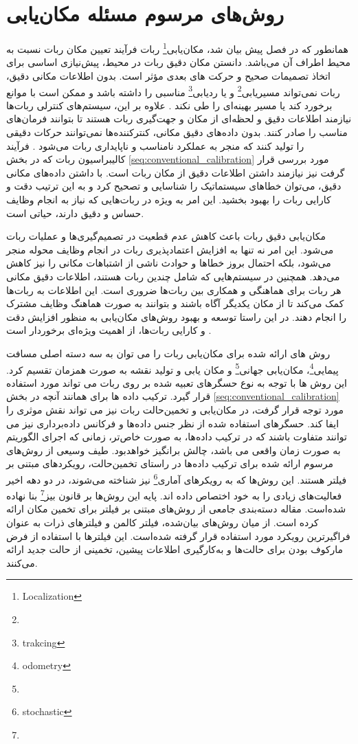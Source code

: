 \section{روش‌های مرسوم مسئله مکان‌یابی}
همانطور که در فصل پیش بیان شد، مکان‌یابی\footnote{Localization}
 ربات فرآیند تعیین مکان ربات نسبت به محیط اطراف آن می‌باشد. دانستن مکان دقیق ربات در محیط، پیش‌نیازی اساسی برای اتخاذ تصمیمات صحیح و حرکت های بعدی مؤثر است. بدون اطلاعات مکانی دقیق، ربات نمی‌تواند مسیریابی\footnote{}
  و یا ردیابی\footnote{trakcing}
مناسبی را داشته باشد و ممکن است با موانع برخورد کند یا مسیر بهینه‌ای را طی نکند
\cite{ahmad2013cooperative}.
 علاوه بر این، سیستم‌های کنترلی ربات‌ها نیازمند اطلاعات دقیق و لحظه‌ای از مکان و جهت‌گیری ربات هستند تا بتوانند فرمان‌های مناسب را صادر کنند. بدون داده‌های دقیق مکانی، کنترکننده‌ها نمی‌توانند حرکات دقیقی را تولید کنند که منجر به عملکرد نامناسب و ناپایداری ربات می‌شود
\cite{guibas1997robot}.
فرآیند کالیبراسیون ربات که در بخش 
\ref{seq:conventional_calibration}
مورد بررسی قرار گرفت نیز نیازمند داشتن اطلاعات دقیق از مکان ربات است. با داشتن داده‌های مکانی دقیق، می‌توان خطاهای سیستماتیک را شناسایی و تصحیح کرد و به این ترتیب دقت و کارایی ربات را بهبود بخشید. این امر به ویژه در ربات‌هایی که نیاز به انجام وظایف حساس و دقیق دارند، حیاتی است. 

مکان‌یابی دقیق ربات باعث کاهش عدم قطعیت در تصمیم‌گیری‌ها و عملیات ربات می‌شود. این امر نه تنها به افزایش اعتمادپذیری ربات در انجام وظایف محوله منجر می‌شود، بلکه احتمال بروز خطاها و حوادث ناشی از اشتباهات مکانی را نیز کاهش می‌دهد. همچنین در سیستم‌هایی که شامل چندین ربات هستند، اطلاعات دقیق مکانی هر ربات برای هماهنگی و همکاری بین ربات‌ها ضروری است. این اطلاعات به ربات‌ها کمک می‌کند تا از مکان یکدیگر آگاه باشند و بتوانند به صورت هماهنگ وظایف مشترک را انجام دهند. در این راستا توسعه و بهبود روش‌های مکان‌یابی به منظور افزایش دقت و کارایی ربات‌ها، از اهمیت ویژه‌ای برخوردار است
\cite{aragues2011multi}.


روش های ارائه شده برای مکان‌یابی ربات را می توان به سه دسته اصلی مسافت پیمایی\footnote{odometry}،
مکان‌یابی جهانی\footnote{}
و مکان یابی و تولید نقشه به صورت همزمان تقسیم کرد. این روش ها با توجه به نوع حسگرهای تعبیه شده بر روی ربات می تواند مورد استفاده قرار گیرد. ترکیب داده ها برای همانند آنچه در بخش
\ref{seq:conventional_calibration}
مورد توجه قرار گرفت، در مکان‌یابی و تخمین‌حالت ربات نیز می تواند نقش موثری را ایفا کند. حسگر‌های استفاده شده از نظر جنس داده‌ها و فرکانس داده‌برداری نیز می توانند متفاوت باشند که در ترکیب داده‌ها، به صورت خاص‌تر، زمانی که اجرای الگوریتم به صورت زمان واقعی می باشد، چالش برانگیز خواهد‌بود. طیف وسیعی از روش‌های مرسوم ارائه شده برای ترکیب داده‌ها در راستای تخمین‌حالت، رویکردهای مبتنی بر فیلتر هستند. این روش‌ها که به رویکرهای آماری\footnote{stochastic}
نیز شناخته می‌شوند، در دو دهه اخیر فعالیت‌های زیادی را به خود اختصاص داده اند. پایه این روش‌ها بر قانون بیز\footnote{}
بنا نهاده شده‌است. مقاله
\cite{panigrahi2022localization} 
دسته‌بندی جامعی از روش‌های مبتنی بر فیلتر برای تخمین مکان ارائه کرده است. از میان روش‌های بیان‌شده، فیلتر کالمن و فیلترهای ذرات به عنوان فراگیرترین رویکرد مورد استفاده قرار گرفته شده‌است. این فیلترها با استفاده از فرض مارکوف بودن برای حالت‌ها و به‌کار‌گیری اطلاعات پیشین، تخمینی از حالت جدید ارائه می‌کنند. 

